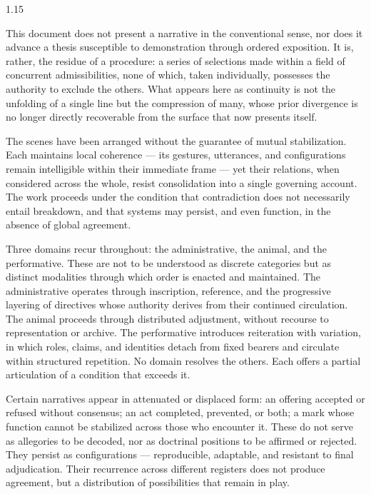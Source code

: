 \documentclass[12pt, oneside]{article}
\begin{document}
\vspace{1.5em}

\begin{spacing}{1.15}

This document does not present a narrative in the conventional sense, nor does it advance a thesis susceptible to demonstration through ordered exposition. It is, rather, the residue of a procedure: a series of selections made within a field of concurrent admissibilities, none of which, taken individually, possesses the authority to exclude the others. What appears here as continuity is not the unfolding of a single line but the compression of many, whose prior divergence is no longer directly recoverable from the surface that now presents itself.

\medskip

The scenes have been arranged without the guarantee of mutual stabilization. Each maintains local coherence --- its gestures, utterances, and configurations remain intelligible within their immediate frame --- yet their relations, when considered across the whole, resist consolidation into a single governing account. The work proceeds under the condition that contradiction does not necessarily entail breakdown, and that systems may persist, and even function, in the absence of global agreement.

\medskip

Three domains recur throughout: the administrative, the animal, and the performative. These are not to be understood as discrete categories but as distinct modalities through which order is enacted and maintained. The administrative operates through inscription, reference, and the progressive layering of directives whose authority derives from their continued circulation. The animal proceeds through distributed adjustment, without recourse to representation or archive. The performative introduces reiteration with variation, in which roles, claims, and identities detach from fixed bearers and circulate within structured repetition. No domain resolves the others. Each offers a partial articulation of a condition that exceeds it.

\medskip

Certain narratives appear in attenuated or displaced form: an offering accepted or refused without consensus; an act completed, prevented, or both; a mark whose function cannot be stabilized across those who encounter it. These do not serve as allegories to be decoded, nor as doctrinal positions to be affirmed or rejected. They persist as configurations --- reproducible, adaptable, and resistant to final adjudication. Their recurrence across different registers does not produce agreement, but a distribution of possibilities that remain in play.


\end{spacing}
\end{document}
